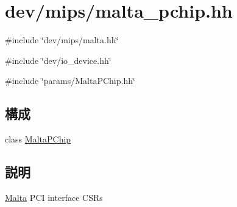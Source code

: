 \hypertarget{malta__pchip_8hh}{
\section{dev/mips/malta\_\-pchip.hh}
\label{malta__pchip_8hh}
}
{\ttfamily \#include \char`\"{}dev/mips/malta.hh\char`\"{}}\par
{\ttfamily \#include \char`\"{}dev/io\_\-device.hh\char`\"{}}\par
{\ttfamily \#include \char`\"{}params/MaltaPChip.hh\char`\"{}}\par
\subsection*{構成}
\begin{DoxyCompactItemize}
\item 
class \hyperlink{classMaltaPChip}{MaltaPChip}
\end{DoxyCompactItemize}


\subsection{説明}
\hyperlink{classMalta}{Malta} PCI interface CSRs 